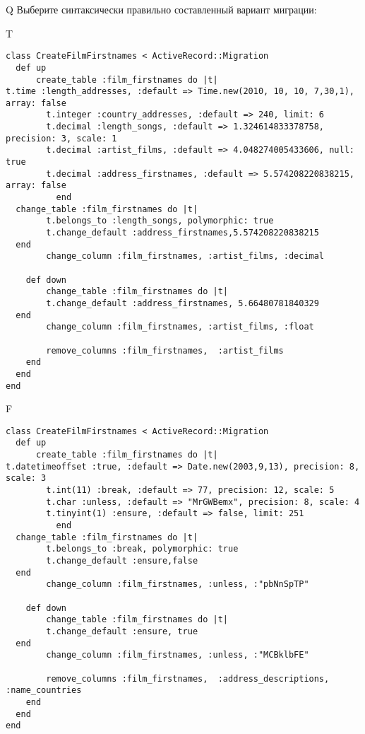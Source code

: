 Q
Выберите синтаксически правильно составленный вариант миграции:

T
\begin{verbatim}
class CreateFilmFirstnames < ActiveRecord::Migration
  def up
	  create_table :film_firstnames do |t|
t.time :length_addresses, :default => Time.new(2010, 10, 10, 7,30,1), array: false
		t.integer :country_addresses, :default => 240, limit: 6
		t.decimal :length_songs, :default => 1.324614833378758, precision: 3, scale: 1
		t.decimal :artist_films, :default => 4.048274005433606, null: true
		t.decimal :address_firstnames, :default => 5.574208220838215, array: false
		  end
  change_table :film_firstnames do |t|
		t.belongs_to :length_songs, polymorphic: true
 		t.change_default :address_firstnames,5.574208220838215
  end
 		change_column :film_firstnames, :artist_films, :decimal
   
	def down
		change_table :film_firstnames do |t|
		t.change_default :address_firstnames, 5.66480781840329
  end
 		change_column :film_firstnames, :artist_films, :float
   
		remove_columns :film_firstnames,  :artist_films 
    end 
  end
end

\end{verbatim}

F
\begin{verbatim}
class CreateFilmFirstnames < ActiveRecord::Migration
  def up
	  create_table :film_firstnames do |t|
t.datetimeoffset :true, :default => Date.new(2003,9,13), precision: 8, scale: 3
		t.int(11) :break, :default => 77, precision: 12, scale: 5
		t.char :unless, :default => "MrGWBemx", precision: 8, scale: 4
		t.tinyint(1) :ensure, :default => false, limit: 251
		  end
  change_table :film_firstnames do |t|
		t.belongs_to :break, polymorphic: true
 		t.change_default :ensure,false
  end
 		change_column :film_firstnames, :unless, :"pbNnSpTP"
   
	def down
		change_table :film_firstnames do |t|
		t.change_default :ensure, true
  end
 		change_column :film_firstnames, :unless, :"MCBklbFE"
   
		remove_columns :film_firstnames,  :address_descriptions, :name_countries 
    end 
  end
end

\end{verbatim}

